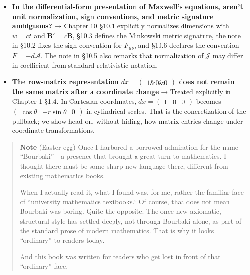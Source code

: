 \documentclass[a4paper,12pt,openany]{book}
\begin{document}
\begin{itemize}
\item
  \textbf{In the differential-form presentation of Maxwell's equations, aren't unit normalization, sign conventions, and metric signature ambiguous?}
  → Chapter 10 §10.1 explicitly normalizes dimensions with \(w=ct\) and
  \(\mathbf{B}'=c\mathbf{B}\), §10.3 defines the Minkowski metric
  signature, the note in §10.2 fixes the sign convention for
  \(F_{\mu\nu}\), and §10.6 declares the convention \(F=-d\mathcal{A}\).
  The note in §10.5 also remarks that normalization of \(\mathcal{J}\)
  may differ in coefficient from standard relativistic notation.
\item
  \textbf{The row-matrix representation $dx = \begin{pmatrix}1\&0\&0\end{pmatrix}$ does not remain the same matrix after a coordinate change}
  → Treated explicitly in Chapter 1 §1.4. In Cartesian coordinates,
  \(dx = \begin{pmatrix}1&0&0\end{pmatrix}\) becomes
  \(\begin{pmatrix}\cos\theta & -r\sin\theta & 0\end{pmatrix}\) in
  cylindrical scales. That is the concretization of the pullback; we
  show head-on, without hiding, how matrix entries change under
  coordinate transformations.
\end{itemize}

\par\vspace{0.35em}\par

\begin{quote}
\textbf{Note} (Easter egg) Once I harbored a borrowed admiration for the
name ``Bourbaki''—a presence that brought a great turn to mathematics.
I thought there must be some sharp new language there, different from
existing mathematics books.

When I actually read it, what I found was, for me, rather the familiar
face of ``university mathematics textbooks.'' Of course, that does not
mean Bourbaki was boring. Quite the opposite. The once-new axiomatic,
structural style has settled deeply, not through Bourbaki alone, as part
of the standard prose of modern mathematics. That is why it looks
``ordinary'' to readers today.

And this book was written for readers who get lost in front of that
``ordinary'' face.
\end{quote}
\end{document}
